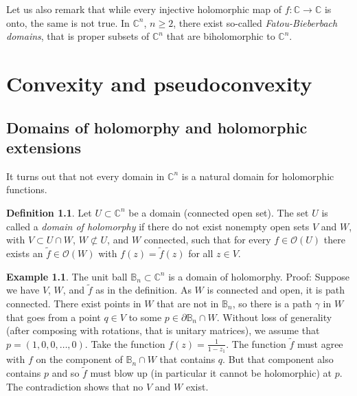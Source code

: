 \documentclass[12pt,openany]{book}
\newcommand{\C}{{\mathbb{C}}}
\newcommand{\bB}{{\mathbb{B}}}
\newcommand{\sO}{{\mathcal{O}}}
\newcommand{\myindex}[1]{#1\index{#1}}
\theoremstyle{plain}
\theoremstyle{remark}
\theoremstyle{definition}
\newtheorem{defn}[thm]{Definition}
\theoremstyle{exercise}
\theoremstyle{example}
\newtheorem{example}[thm]{Example}
\begin{document}
Let us also remark that while every injective holomorphic
map of $f \colon \C \to \C$ is onto, the same is not true.
In $\C^n$, $n \geq 2$, there exist so-called
\emph{Fatou-Bieberbach domains},
that is proper subsets of $\C^n$ that are biholomorphic to $\C^n$.



\chapter{Convexity and pseudoconvexity} \label{ch:convexity}


\section{Domains of holomorphy and holomorphic extensions}

It turns out that not every domain in $\C^n$ is a natural domain for
holomorphic functions.

\begin{defn}
Let $U \subset \C^n$ be a domain (connected open set).  The set $U$ is
called a \emph{\myindex{domain of holomorphy}} if there do not exist
nonempty open sets
$V$ and $W$, with $V \subset U \cap W$, $W \not\subset U$, and $W$
connected, such that for every $f \in \sO(U)$ there exists an $\widetilde{f} \in
\sO(W)$ with $f(z) = \widetilde{f}(z)$ for all $z \in V$.
\end{defn}


\begin{center}

\end{center}


\begin{example}
The unit ball $\bB_n \subset \C^n$ is a domain of holomorphy.  Proof: 
Suppose we have $V$, $W$, and $\widetilde{f}$ as in the definition.  As $W$ is
connected and open, it is path connected.  There exist
points in $W$ that are not in $\bB_n$, so there
is a path $\gamma$ in $W$ that goes
from a point $q \in V$ to some $p \in \partial \bB_n \cap W$.
Without loss of generality (after composing with
rotations, that is unitary matrices), we assume that $p =
(1,0,0,\ldots,0)$.  Take the function $f(z) = \frac{1}{1-z_1}$.  
The function $\widetilde{f}$ must agree with $f$ on the component of
$\bB_n \cap W$ that contains $q$.  But that component also contains $p$ and
so $\widetilde{f}$ must blow up (in particular it cannot be holomorphic) at
$p$.  The contradiction shows that no $V$ and $W$ exist.
\end{example}
\end{document}
